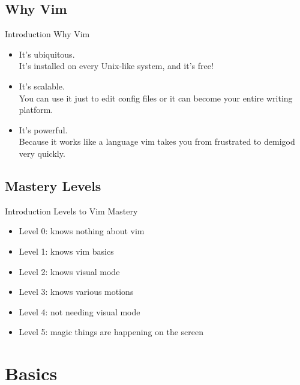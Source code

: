 \documentclass{beamer}
\begin{document}
\subsection{Why Vim}
\begin{frame} {Introduction} {Why Vim}
    \begin{itemize}
        \item It's ubiquitous. \\It's installed on every Unix-like system, and it's free!\\
        \item It's scalable. \\You can use it just to edit config files or it can become your entire writing platform. \\
        \item It's powerful. \\Because it works like a language vim takes you from frustrated to demigod very quickly. \\
    \end{itemize}
\end{frame}


\subsection{Mastery Levels}
\begin{frame} {Introduction} {Levels to Vim Mastery}
    \begin{itemize}
        \item Level 0: knows nothing about vim \\
        \item Level 1: knows vim basics \\
        \item Level 2: knows visual mode \\
        \item Level 3: knows various motions \\
        \item Level 4: not needing visual mode \\
        \item Level 5: magic things are happening on the screen \\
    \end{itemize}
\end{frame}


\section{Basics}
\end{document}
